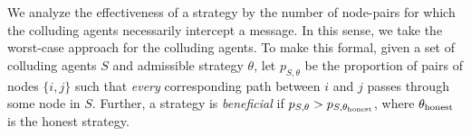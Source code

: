 \documentclass{comnet}
\providecommand{\DIFdelbegin}{} %
\begin{document}
We analyze the effectiveness of a strategy by the number of node-pairs for
which the colluding agents necessarily intercept a message. In this sense, we
take the worst-case approach for the colluding agents. To make this formal,
given a set of colluding agents $S$ and admissible strategy $\theta$, let
$p_{S,\theta}$ be the proportion of pairs of nodes $\{i, j\}$ such that {\em
every} corresponding path between $i$ and $j$ passes through some node in $S$.
Further, a strategy is \emph{beneficial} if $p_{S,\theta} > p_{S,
\theta_{\textup{honest}}}$, where $\theta_{\textup{honest}}$ is the honest
strategy.

\DIFdelbegin %
\end{document}
